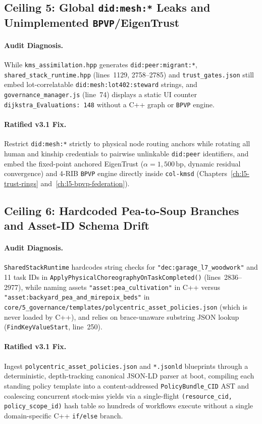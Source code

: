\subsection{Ceiling 5: Global \texttt{did:mesh:*} Leaks and Unimplemented \texttt{BPVP}/EigenTrust}

\paragraph{Audit Diagnosis.}
While \texttt{kms\_assimilation.hpp} generates \texttt{did:peer:migrant:*},
\texttt{shared\_stack\_runtime.hpp} (lines~1129, 2758--2785) and \texttt{trust\_gates.json}
still embed lot-correlatable \texttt{did:mesh:lot402:steward} strings, and
\texttt{governance\_manager.js} (line~74) displays a static UI counter
\texttt{dijkstra\_Evaluations: 148} without a C++ graph or \texttt{BPVP} engine.

\paragraph{Ratified v3.1 Fix.}
Restrict \texttt{did:mesh:*} strictly to physical node routing anchors while rotating all human
and kinship credentials to pairwise unlinkable \texttt{did:peer} identifiers, and embed the
fixed-point anchored EigenTrust ($\alpha = 1{,}500\,\mathrm{bp}$, dynamic residual convergence)
and 4-RIB \texttt{BPVP} engine directly inside \texttt{col-kmsd} (Chapters~\ref{ch:l5-trust-rings}
and~\ref{ch:l5-bpvp-federation}).

\subsection{Ceiling 6: Hardcoded Pea-to-Soup Branches and Asset-ID Schema Drift}

\paragraph{Audit Diagnosis.}
\texttt{SharedStackRuntime} hardcodes string checks for \texttt{"dec:garage\_l7\_woodwork"} and
11 task IDs in \texttt{ApplyPhysicalChoreographyOnTaskCompleted()} (lines~2836--2977), while
naming assets \texttt{"asset:pea\_cultivation"} in C++ versus
\texttt{"asset:backyard\_pea\_and\_mirepoix\_beds"} in
\texttt{core/5\_governance/templates/polycentric\_asset\_policies.json} (which is never loaded
by C++), and relies on brace-unaware substring JSON lookup (\texttt{FindKeyValueStart}, line~250).

\paragraph{Ratified v3.1 Fix.}
Ingest \texttt{polycentric\_asset\_policies.json} and \texttt{*.jsonld} blueprints through a
deterministic, depth-tracking canonical JSON-LD parser at boot, compiling each standing policy
template into a content-addressed \texttt{PolicyBundle\_CID} AST and coalescing concurrent
stock-miss yields via a single-flight \texttt{(resource\_cid, policy\_scope\_id)} hash table so
hundreds of workflows execute without a single domain-specific C++ \texttt{if/else} branch.

